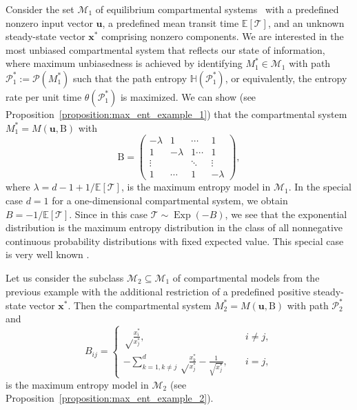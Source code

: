 \documentclass[smallextended]{svjour3}
\makeatletter
\renewcommand*{\eqref}[1]{%
  \hyperref[{#1}]{\textup{\tagform@{\ref*{#1}}}}%
}
\renewcommand{\tens}[1]{\mathrm{#1}}
\renewcommand{\vec}[1]{\mathbf{#1}}
\newcommand{\E}{\mathbb{E}}
\newcommand{\TT}{\mathcal{T}}
\renewcommand{\H}{\mathbb{H}}
\newcommand{\Exp}{\operatorname{Exp}}
\newcommand{\suml}{\sum\limits}
\makeatother
\begin{document}
\begin{example}
\label{max_ent_example_1}
Consider the set $\mathcal{M}_1$ of equilibrium compartmental systems~\eqref{eqn:lin_CS_sys} with a predefined nonzero input vector $\vec{u}$, a predefined mean transit time $\E\left[\TT\right]$, and an unknown steady-state vector $\vec{x}^\ast$ comprising nonzero components.
We are interested in the most unbiased compartmental system that reflects our state of information, where maximum unbiasedness is achieved by identifying $M^\ast_1\in\mathcal{M}_1$ with path $\mathcal{P}^\ast_1:=\mathcal{P}(M^\ast_1)$ such that the path entropy $\H(\mathcal{P}^\ast_1)$, or equivalently, the entropy rate per unit time $\theta(\mathcal{P}^\ast_1)$ is maximized. 
We can show (see Proposition~\ref{proposition:max_ent_example_1}) that the compartmental system $M^\ast_1=M(\vec{u},\tens{B})$ with 
\begin{equation}
	\tens{B} = \begin{pmatrix}
    -\lambda & 1 & \cdots & 1\\
		1 & -\lambda & 1 \cdots & 1 \\
		\vdots & & \ddots & \vdots\\
		1 & \cdots & 1 & -\lambda
  \end{pmatrix},
\end{equation}
where $\lambda=d-1+1/\E\left[\TT\right]$, 		
is the maximum entropy model in $\mathcal{M}_1$.
In the special case $d=1$ for a one-dimensional compartmental system, we obtain $B=-1/\E\left[\TT\right]$.
Since in this case $\TT\sim\Exp(-B)$, we see that the exponential distribution is the maximum entropy distribution in the class of all nonnegative continuous probability distributions with fixed expected value.
This special case is very well known \citep[Example~12.2.5]{Cover2006}.
\end{example}

\begin{example}
\label{max_ent_example_2}
Let us consider the subclass $\mathcal{M}_2\subseteq\mathcal{M}_1$ of compartmental models from the previous example with the additional restriction of a predefined positive steady-state vector $\vec{x}^\ast$.
Then the compartmental system $M^\ast_2=M(\vec{u},\tens{B})$ with path $\mathcal{P}^\ast_2$ and
\begin{equation}
	B_{ij} = \begin{cases}
    \sqrt\frac{x_i^\ast}{x_j^\ast},\quad & i\neq j,\\
		-\suml_{k=1,k\neq j}^d \sqrt\frac{x_k^\ast}{x_j^\ast} - \frac{1}{\sqrt{x_j^\ast}}, \quad &i=j,
		\end{cases}
  \end{equation}
is the maximum entropy model in $\mathcal{M}_2$ (see Proposition~\ref{proposition:max_ent_example_2}).
\end{example}
\end{document}
